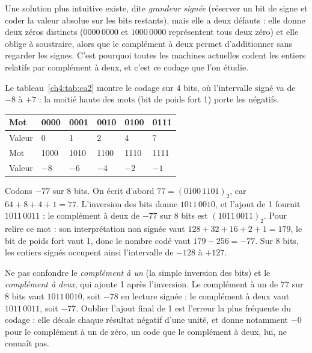 Une solution plus intuitive existe, dite \emph{grandeur signée} (réserver un bit de signe et coder la valeur absolue sur les bits restants), mais elle a deux défauts : elle donne deux zéros distincts ($0000\,0000$ et $1000\,0000$ représentent tous deux zéro) et elle oblige à soustraire, alors que le complément à deux permet d'additionner sans regarder les signes. C'est pourquoi toutes les machines actuelles codent les entiers relatifs par complément à deux, et c'est ce codage que l'on étudie.

Le tableau~\ref{ch4:tab:ca2} montre le codage sur 4 bits, où l'intervalle signé va de $-8$ à $+7$ : la moitié haute des mots (bit de poids fort 1) porte les négatifs.

\begin{center}
\small
\begin{tabular}{C{1.5cm}C{1.5cm}C{1.5cm}C{1.5cm}C{1.5cm}C{1.5cm}}
\toprule
{}Mot & 0000 & 0001 & 0010 & 0100 & 0111\\
\midrule
Valeur & 0 & 1 & 2 & 4 & 7\\
Mot & 1000 & 1010 & 1100 & 1110 & 1111\\
Valeur & $-8$ & $-6$ & $-4$ & $-2$ & $-1$\\
\bottomrule
\end{tabular}
\label{ch4:tab:ca2}
\end{center}

\begin{exemple}
Codons $-77$ sur 8 bits. On écrit d'abord $77 = (0100\,1101)_2$, car $64 + 8 + 4 + 1 = 77$. L'inversion des bits donne $1011\,0010$, et l'ajout de 1 fournit $1011\,0011$ : le complément à deux de $-77$ sur 8 bits est $(1011\,0011)_2$. Pour relire ce mot : son interprétation non signée vaut $128 + 32 + 16 + 2 + 1 = 179$, le bit de poids fort vaut 1, donc le nombre codé vaut $179 - 256 = -77$. Sur 8 bits, les entiers signés occupent ainsi l'intervalle de $-128$ à $+127$.
\end{exemple}

\begin{attention}
Ne pas confondre le \emph{complément à un} (la simple inversion des bits) et le \emph{complément à deux}, qui ajoute 1 après l'inversion. Le complément à un de $77$ sur 8 bits vaut $1011\,0010$, soit $-78$ en lecture signée ; le complément à deux vaut $1011\,0011$, soit $-77$. Oublier l'ajout final de 1 est l'erreur la plus fréquente du codage : elle décale chaque résultat négatif d'une unité, et donne notamment $-0$ pour le complément à un de zéro, un code que le complément à deux, lui, ne connaît pas.
\end{attention}

